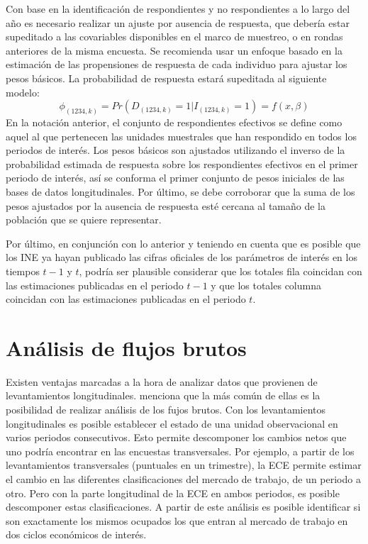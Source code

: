 \documentclass[
  10pt,
  spanish,
]{book}
\begin{document}
Con base en la identificación de respondientes y no respondientes a lo largo del año es necesario realizar un ajuste por ausencia de respuesta, que debería estar supeditado a las covariables disponibles en el marco de muestreo, o en rondas anteriores de la misma encuesta. Se recomienda usar un enfoque basado en la estimación de las propensiones de respuesta de cada individuo para ajustar los pesos básicos. La probabilidad de respuesta estará supeditada al siguiente modelo:
\[
\phi_{(1234,k)}=Pr(D_{(1234,k)}=1|I_{(1234,k)}=1)=f(x,\beta)
\]
En la notación anterior, el conjunto de respondientes efectivos se define como aquel al que pertenecen las unidades muestrales que han respondido en todos los periodos de interés. Los pesos básicos son ajustados utilizando el inverso de la probabilidad estimada de respuesta sobre los respondientes efectivos en el primer periodo de interés, así se conforma el primer conjunto de pesos iniciales de las bases de datos longitudinales. Por último, se debe corroborar que la suma de los pesos ajustados por la ausencia de respuesta esté cercana al tamaño de la población que se quiere representar.

Por último, en conjunción con lo anterior y teniendo en cuenta que es posible que los INE ya hayan publicado las cifras oficiales de los parámetros de interés en los tiempos \(t-1\) y \(t\), podría ser plausible considerar que los totales fila coincidan con las estimaciones publicadas en el periodo \(t-1\) y que los totales columna coincidan con las estimaciones publicadas en el periodo \(t\).

\hypertarget{anuxe1lisis-de-flujos-brutos}{%
\chapter{Análisis de flujos brutos}\label{anuxe1lisis-de-flujos-brutos}}

Existen ventajas marcadas a la hora de analizar datos que provienen de levantamientos longitudinales. \citet{Lynn_2009} menciona que la más común de ellas es la posibilidad de realizar análisis de los fujos brutos. Con los levantamientos longitudinales es posible establecer el estado de una unidad observacional en varios periodos consecutivos. Esto permite descomponer los cambios netos que uno podría encontrar en las encuestas transversales. Por ejemplo, a partir de los levantamientos transversales (puntuales en un trimestre), la ECE permite estimar el cambio en las diferentes clasificaciones del mercado de trabajo, de un periodo a otro. Pero con la parte longitudinal de la ECE en ambos periodos, es posible descomponer estas clasificaciones. A partir de este análisis es posible identificar si son exactamente los mismos ocupados los que entran al mercado de trabajo en dos ciclos económicos de interés.
\end{document}
